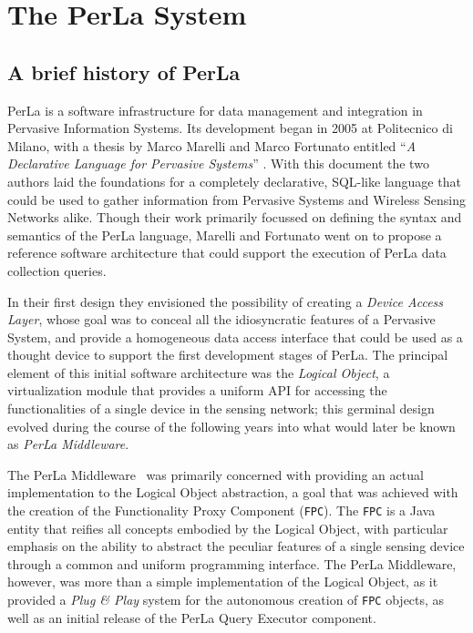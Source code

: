 \chapter{The PerLa System}

\section{A brief history of PerLa}

PerLa is a software infrastructure for data management and integration in
Pervasive Information Systems. Its development began in 2005 at Politecnico di
Milano, with a thesis by Marco Marelli and Marco Fortunato entitled ``\textit{A
Declarative Language for Pervasive Systems}'' \cite{mm_thesis}. With this
document the two authors laid the foundations for a completely declarative,
SQL-like language that could be used to gather information from Pervasive
Systems and Wireless Sensing Networks alike. Though their work primarily
focussed on defining the syntax and semantics of the PerLa language, Marelli
and Fortunato went on to propose a reference software architecture that could
support the execution of PerLa data collection queries.

In their first design they envisioned the possibility of creating a
\textit{Device Access Layer}, whose goal was to conceal all the idiosyncratic
features of a Pervasive System, and provide a homogeneous data access interface
that could be used as a thought device to support the first development stages
of PerLa. The principal element of this initial software architecture was the
\textit{Logical Object}, a virtualization module that provides a uniform API
for accessing the functionalities of a single device in the sensing network;
this germinal design evolved during the course of the following years
into what would later be known as \textit{PerLa Middleware}. 

The PerLa Middleware~\cite{tse_perla} was primarily concerned with providing an
actual implementation to the Logical Object abstraction, a goal that was
achieved with the creation of the Functionality Proxy Component (\texttt{FPC}).
The \texttt{FPC} is a Java entity that reifies all concepts embodied by the
Logical Object, with particular emphasis on the ability to abstract the
peculiar features of a single sensing device through a common and uniform
programming interface. The PerLa Middleware, however, was more than a simple
implementation of the Logical Object, as it provided a \textit{Plug \& Play}
system for the autonomous creation of \texttt{FPC} objects, as well as an
initial release of the PerLa Query Executor component.

